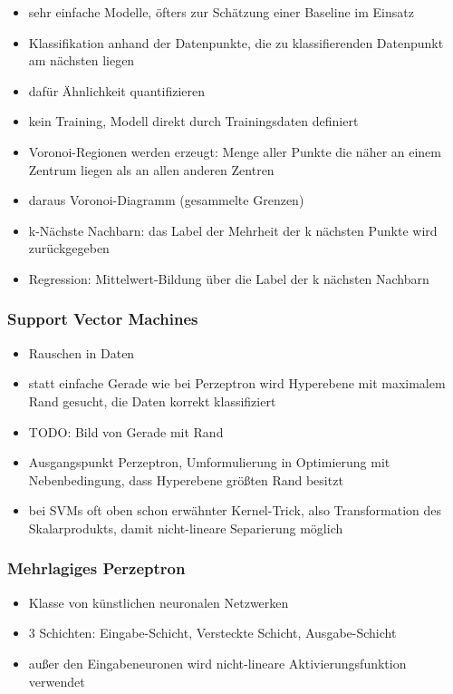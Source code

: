 		\begin{itemize}
			\item sehr einfache Modelle, öfters zur Schätzung einer Baseline im Einsatz
			\item Klassifikation anhand der Datenpunkte, die zu klassifierenden Datenpunkt am nächsten liegen
			\item dafür Ähnlichkeit quantifizieren
			\item kein Training, Modell direkt durch Trainingsdaten definiert
			\item Voronoi-Regionen werden erzeugt: Menge aller Punkte die näher an einem Zentrum liegen als an allen anderen Zentren
			\item daraus Voronoi-Diagramm (gesammelte Grenzen)
			\item k-Nächste Nachbarn: das Label der Mehrheit der k nächsten Punkte wird zurückgegeben
			\item Regression: Mittelwert-Bildung über die Label der k nächsten Nachbarn
		\end{itemize}
		
		\subsubsection{Support Vector Machines}
		
		\begin{itemize}
			\item Rauschen in Daten
			\item statt einfache Gerade wie bei Perzeptron wird Hyperebene mit maximalem Rand gesucht, die Daten korrekt klassifiziert
			\item TODO: Bild von Gerade mit Rand
			\item Ausgangspunkt Perzeptron, Umformulierung in Optimierung mit Nebenbedingung, dass Hyperebene größten Rand besitzt
			\item bei SVMs oft oben schon erwähnter Kernel-Trick, also Transformation des Skalarprodukts, damit nicht-lineare Separierung möglich
		\end{itemize}
		
		\subsubsection{Mehrlagiges Perzeptron}
		
		\begin{itemize}
			\item Klasse von künstlichen neuronalen Netzwerken
			\item 3 Schichten: Eingabe-Schicht, Versteckte Schicht, Ausgabe-Schicht
			\item außer den Eingabeneuronen wird nicht-lineare Aktivierungsfunktion verwendet
		\end{itemize}


